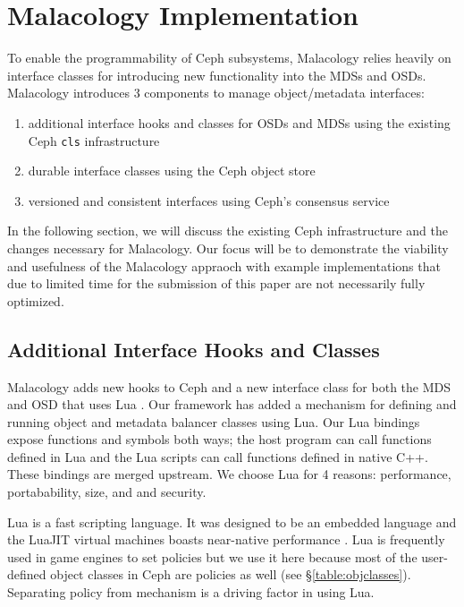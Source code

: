 \documentclass[10pt,twocolumn]{article}
\begin{document}
\section{Malacology Implementation}\label{malacology-implementation}

\label{implementation}

To enable the programmability of Ceph subsystems, Malacology relies
heavily on interface classes for introducing new functionality into the
MDSs and OSDs. Malacology introduces 3 components to manage
object/metadata interfaces:

\begin{enumerate}
\def\labelenumi{\arabic{enumi}.}
\item
  additional interface hooks and classes for OSDs and MDSs using the
  existing Ceph \texttt{cls} infrastructure
\item
  durable interface classes using the Ceph object store
\item
  versioned and consistent interfaces using Ceph's consensus service
\end{enumerate}

In the following section, we will discuss the existing Ceph
infrastructure and the changes necessary for Malacology. Our focus will
be to demonstrate the viability and usefulness of the Malacology
appraoch with example implementations that due to limited time for the
submission of this paper are not necessarily fully optimized.

\subsection{Additional Interface Hooks and
Classes}\label{additional-interface-hooks-and-classes}

Malacology adds new hooks to Ceph and a new interface class for both the
MDS and OSD that uses Lua
\autocite{ierusalimschy:lua15}\autocite{ierusalimschy:spe96}. Our
framework has added a mechanism for defining and running object and
metadata balancer classes using Lua. Our Lua bindings expose functions
and symbols both ways; the host program can call functions defined in
Lua and the Lua scripts can call functions defined in native C++. These
bindings are merged upstream. We choose Lua for 4 reasons: performance,
portabability, size, and and security.

Lua is a fast scripting language. It was designed to be an embedded
language and the LuaJIT virtual machines boasts near-native performance
\autocite{pall:luajit15}\autocite{grawinkel_pdsw12}. Lua is frequently
used in game engines to set policies but we use it here because most of
the user-defined object classes in Ceph are policies as well (see
\S\ref{table:objclasses}). Separating policy from mechanism is a driving
factor in using Lua.
\end{document}
